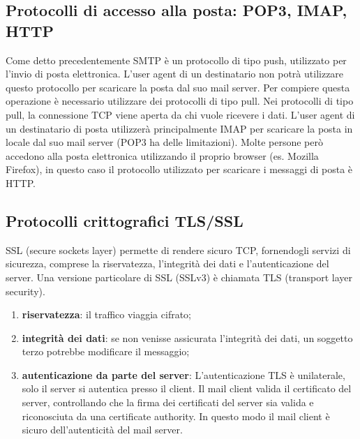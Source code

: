 \subsection{Protocolli di accesso alla posta: POP3, IMAP, HTTP}
Come detto precedentemente SMTP è un protocollo di tipo push, 
utilizzato per l’invio di posta elettronica. L’user agent di un destinatario non potrà utilizzare questo 
protocollo per scaricare la posta dal suo mail server. 
Per compiere questa operazione è necessario utilizzare dei protocolli di tipo pull. 
Nei protocolli di tipo pull, la connessione TCP viene aperta da chi vuole ricevere i dati. 
L’user agent di un destinatario di posta utilizzerà principalmente IMAP per scaricare la posta in locale 
dal suo mail server (POP3 ha delle limitazioni). 
Molte persone però accedono alla posta elettronica utilizzando il proprio browser (es. Mozilla Firefox), 
in questo caso il protocollo utilizzato per scaricare i messaggi di posta è HTTP.

\subsection{Protocolli crittografici TLS/SSL}
SSL (secure sockets layer) permette di rendere sicuro TCP,  fornendogli servizi di sicurezza, 
comprese la riservatezza, l’integrità dei dati e l’autenticazione del server. 
Una versione particolare di SSL (SSLv3) è chiamata TLS (transport layer security).\cite{tls}

\begin{enumerate}
    \item \textbf{riservatezza}: il traffico viaggia cifrato;
    \item \textbf{integrità dei dati}: se non venisse assicurata l'integrità dei dati, un soggetto terzo
    potrebbe modificare il messaggio;
    \item \textbf{autenticazione da parte del server}: L'autenticazione TLS è unilaterale, solo il server si 
    autentica presso il client. Il mail client valida il certificato del server, controllando che la firma dei 
    certificati del server sia valida e riconosciuta da una certificate authority.
    In questo modo il mail client è sicuro dell'autenticità del mail server. 
\end{enumerate}


